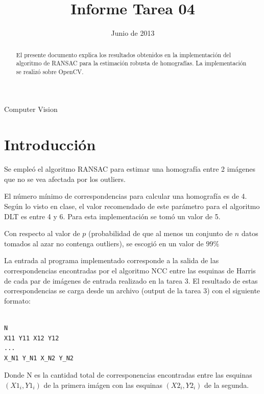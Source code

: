 \documentclass{IEEEtran}
\begin{document}
\title{Informe Tarea 04}
\date {Junio de 2013}
\author{
}
\maketitle


\begin{abstract}
El presente documento explica los resultados obtenidos en la implementación del algoritmo
de RANSAC para la estimación robusta de homografías. 
La implementación se realizó sobre OpenCV.
\end{abstract}

\begin{IEEEkeywords}
Computer Vision
\end{IEEEkeywords}

\section{Introducción}

Se empleó el algoritmo RANSAC para estimar una homografía entre 2 imágenes
que no se vea afectada por los outliers.

El número mínimo de correspondencias para calcular una homografía es de 4.
Según lo visto en clase, el valor recomendado de este parámetro para el 
algoritmo DLT es entre 4 y 6. Para esta implementación
se tomó un valor de 5.

Con respecto al valor de $p$ (probabilidad de que al menos un conjunto de
$n$ datos tomados al azar no contenga outliers), se escogió en un valor
de $99\%$

La entrada al programa implementado corresponde a la salida de las correspondencias
encontradas por el algoritmo NCC entre las esquinas de Harris de cada par de imágenes
de entrada realizado en la tarea 3. El resultado de estas correspondencias se 
carga desde un archivo (output de la tarea 3) con el siguiente formato:

\begin{verbatim}

N
X11 Y11 X12 Y12
...
X_N1 Y_N1 X_N2 Y_N2

\end{verbatim}

Donde N es la cantidad total de corresponencias encontradas
entre las esquinas $(X1_i, Y1_i)$ de la primera imágen con
las esquinas $(X2_i, Y2_i)$ de la segunda.
\end{document}
